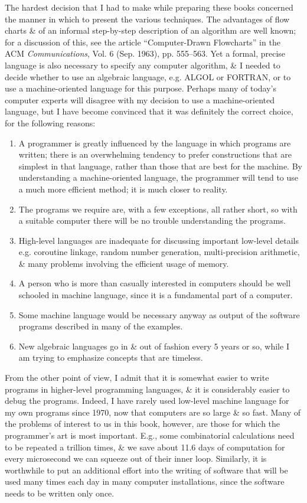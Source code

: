 \documentclass{article}
\begin{document}
The hardest decision that I had to make while preparing these books concerned the manner in which to present the various techniques. The advantages of flow charts \& of an informal step-by-step description of an algorithm are well known; for a discussion of this, see the article ``Computer-Drawn Flowcharts'' in the ACM {\it Communications}, Vol. 6 (Sep. 1963), pp. 555--563. Yet a formal, precise language is also necessary to specify any computer algorithm, \& I needed to decide whether to use an algebraic language, e.g. ALGOL or FORTRAN, or to use a machine-oriented language for this purpose. Perhaps many of today's computer experts will disagree with my decision to use a machine-oriented language, but I have become convinced that it was definitely the correct choice, for the following reasons:
\begin{enumerate}
	\item A programmer is greatly influenced by the language in which programs are written; there is an overwhelming tendency to prefer constructions that are simplest in that language, rather than those that are best for the machine. By understanding a machine-oriented language, the programmer will tend to use a much more efficient method; it is much closer to reality.
	\item The programs we require are, with a few exceptions, all rather short, so with a suitable computer there will be no trouble understanding the programs.
	\item High-level languages are inadequate for discussing important low-level details e.g. coroutine linkage, random number generation, multi-precision arithmetic, \& many problems involving the efficient usage of memory.
	\item A person who is more than casually interested in computers should be well schooled in machine language, since it is a fundamental part of a computer.
	\item Some machine language would be necessary anyway as output of the software programs described in many of the examples.
	\item New algebraic languages go in \& out of fashion every 5 years or so, while I am trying to emphasize concepts that are timeless.
\end{enumerate}
From the other point of view, I admit that it is somewhat easier to write programs in higher-level programming languages, \& it is considerably easier to debug the programs. Indeed, I have rarely used low-level machine language for my own programs since 1970, now that computers are so large \& so fast. Many of the problems of interest to us in this book, however, are those for which the programmer's art is most important. E.g., some combinatorial calculations need to be repeated a trillion times, \& we save about 11.6 days of computation for every microsecond we can squeeze out of their inner loop. Similarly, it is worthwhile to put an additional effort into the writing of software that will be used many times each day in many computer installations, since the software needs to be written only once.
\end{document}
